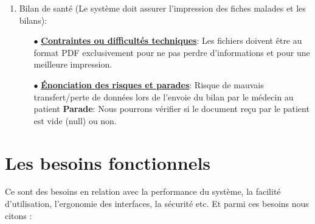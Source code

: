 \documentclass[a4paper]{book}
\begin{document}
\begin{enumerate}
    \item Bilan de santé (Le système doit assurer l’impression des fiches malades et les bilans): \newline
    \begin{itemize}
        \item[$\bullet$] \textbf{\underline{Contraintes ou difficultés techniques}}: Les fichiers doivent être au format PDF exclusivement pour ne pas perdre d’informations et pour une meilleure impression.
        \item[$\bullet$] \textbf{\underline{Énonciation des risques et parades}}: Risque de mauvais transfert/perte de données lors de l’envoie du bilan par le médecin au patient\newline
        \textbf{Parade}: Nous pourrons vérifier si le document reçu par le patient est vide (null) ou non.
    \end{itemize}
\end{enumerate}

\section{Les besoins fonctionnels}

Ce sont des besoins en relation avec la performance du système, la facilité d’utilisation,
l’ergonomie des interfaces, la sécurité etc. Et parmi ces besoins nous citons :
\end{document}
